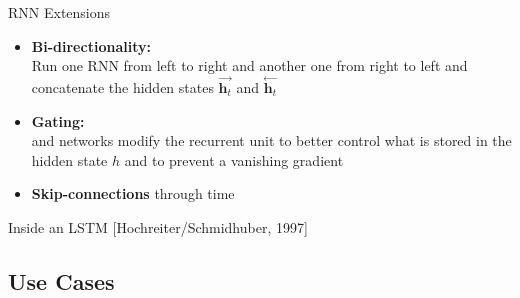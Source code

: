 \begin{frame}{RNN Extensions}{}\optional
	\begin{itemize}
		\item \textbf{Bi-directionality:} \\
			Run one RNN from left to right and another one from right to left and concatenate the hidden states
			$\overset{\rightarrow}{\bm{h}_t}$ and $\overset{\leftarrow}{\bm{h}_t}$
		\item \textbf{Gating:} \\
			 and  networks modify the recurrent unit
			to better control what is stored in the hidden state $h$ and to prevent a vanishing gradient
		\item \textbf{Skip-connections} through time
	\end{itemize}
\end{frame}


\begin{frame}{Inside an LSTM [Hochreiter/Schmidhuber, 1997]}{}\optional
\end{frame}


\subsection{Use Cases}

